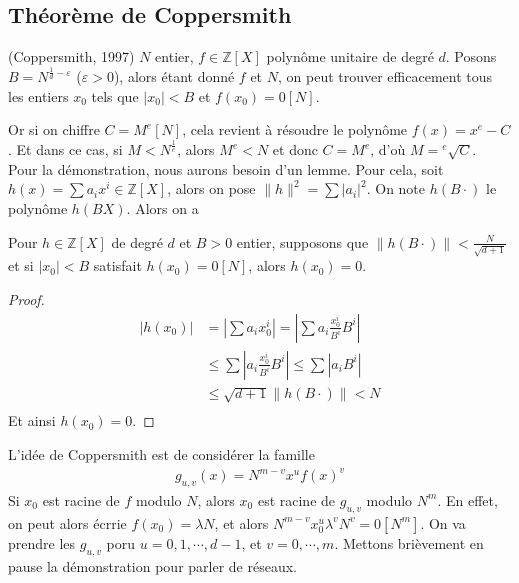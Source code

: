         \subsection{Théorème de Coppersmith}
            \begin{theo} (Coppersmith, 1997)
                $N$ entier, $f \in \mathbb{Z}[X]$ polynôme unitaire de degré $d$. Posons $B = N^{\frac 1d - \varepsilon}$ ($\varepsilon > 0$), alors étant donné $f$ et $N$, on peut trouver efficacement tous les entiers $x_0$ tels que $|x_0| < B$ et $f(x_0) = 0 [N]$.
            \end{theo}
            Or si on chiffre $C = M^e [N]$, cela revient à résoudre le polynôme $f(x) = x^e - C$. Et dans ce cas, si $M < N^{\frac 1e}$, alors $M^e < N$ et donc $C = M^e$, d'où $M = {}^e\sqrt{C}$. \\
            Pour la démonstration, nous aurons besoin d'un lemme. Pour cela, soit $h(x) = \sum a_i x^i \in \mathbb{Z}[X]$, alors on pose $\|h\|^2 = \sum |a_i|^2$. On note $h(B \cdot)$ le polynôme $h(BX)$. Alors on a
            \begin{lemm}
                Pour $h \in \mathbb{Z}[X]$ de degré $d$ et $B > 0$ entier, supposons que $\|h(B \cdot) \| < \frac{N}{\sqrt{d + 1}}$ et si $|x_0| < B$ satisfait $h(x_0) = 0 [N]$, alors $h(x_0) = 0$.
            \end{lemm}
            \begin{proof}
                \begin{align*}
                    |h(x_0)| &= \left| \sum a_i x_0^i \right| = \left| \sum a_i \frac{x_0^i}{B^i}B^i \right| \\
                    &\leq \sum \left| a_i \frac{x_0^i}{B^i}B^i \right| \leq \sum \left| a_i B^i \right| \\
                    &\leq \sqrt{d + 1} \|h(B \cdot) \| < N \\
                \end{align*}
                Et ainsi $h(x_0) = 0$.
            \end{proof}
            L'idée de Coppersmith est de considérer la famille 
            \begin{align*}
                g_{u, v}(x) = N^{m - v} x^u f(x)^v
            \end{align*}
            Si $x_0$ est racine de $f$ modulo $N$, alors $x_0$ est racine de $g_{u, v}$ modulo $N^m$. En effet, on peut alors écrrie $f(x_0) = \lambda N$, et alors $N^{m - v} x_0^u \lambda^v N^v = 0[N^m]$. On va prendre les $g_{u, v}$ poru $u = 0, 1, \cdots, d - 1$, et $v = 0, \cdots, m$. Mettons brièvement en pause la démonstration pour parler de réseaux.

